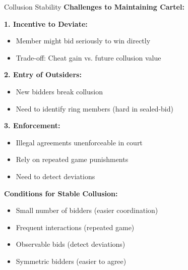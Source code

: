 \documentclass[xcolor={x11names}, aspectratio=169 ]{beamer}
\begin{document}
\begin{frame}{Collusion Stability}
\textbf{Challenges to Maintaining Cartel:}

\textbf{1. Incentive to Deviate:}
\begin{itemize}
  \item Member might bid seriously to win directly
  \item Trade-off: Cheat gain vs. future collusion value
\end{itemize}

\textbf{2. Entry of Outsiders:}
\begin{itemize}
  \item New bidders break collusion
  \item Need to identify ring members (hard in sealed-bid)
\end{itemize}

\textbf{3. Enforcement:}
\begin{itemize}
  \item Illegal agreements unenforceable in court
  \item Rely on repeated game punishments
  \item Need to detect deviations
\end{itemize}

\textbf{Conditions for Stable Collusion:}
\begin{itemize}
  \item Small number of bidders (easier coordination)
  \item Frequent interactions (repeated game)
  \item Observable bids (detect deviations)
  \item Symmetric bidders (easier to agree)
\end{itemize}
\end{frame}
\end{document}
